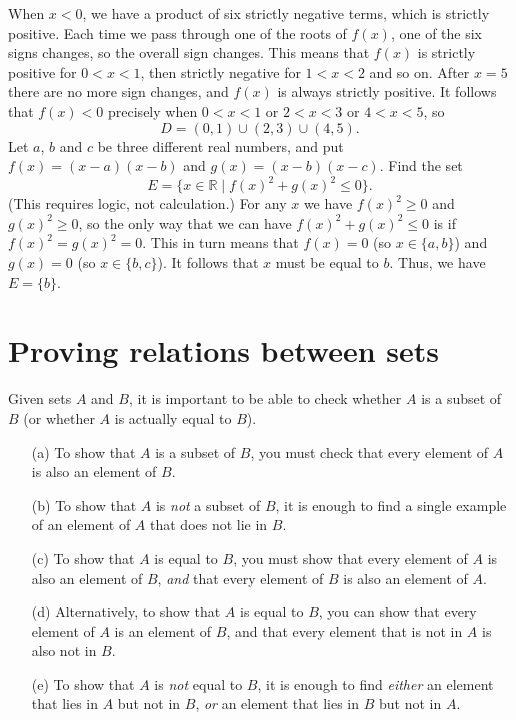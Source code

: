 \documentclass[a4paper]{book}
\newcommand{\RED}[1]{{\color{red}#1}}
\newcommand{\R}         {{\mathbb{R}}}
\newcommand{\st}        {\;|\;}
\renewcommand{\:}{\colon}
\newcommand{\EMPH}[1]{\RED{\emph{#1}}}
\theoremstyle{definition}
\newenvironment{starex}{
 \renewcommand{\thetheorem}{\arabic{chapter}.\arabic{section}.\arabic{theorem}${}^*$}
 \exercise
}{\endexercise}
\renewenvironment{solution}{\SolutionInline}{\endSolutionInline}
\begin{document}
\begin{solution}
 When $x<0$, we have a product of six strictly negative terms, which
 is strictly positive.  Each time we pass through one of the roots of
 $f(x)$, one of the six signs changes, so the overall sign changes.
 This means that $f(x)$ is strictly positive for $0<x<1$, then
 strictly negative for $1<x<2$ and so on.  After $x=5$ there are no
 more sign changes, and $f(x)$ is always strictly positive.  It
 follows that $f(x)<0$ precisely when $0<x<1$ or $2<x<3$ or $4<x<5$,
 so 
 \[ D = (0,1) \cup (2,3) \cup (4,5). \]
\end{solution}
\begin{starex}
 Let $a$, $b$ and $c$ be three different real numbers, and put
 $f(x)=(x-a)(x-b)$ and $g(x)=(x-b)(x-c)$.  Find the set 
 \[ E = \{ x\in\R \st f(x)^2 + g(x)^2 \leq 0\}. \]
 (This requires logic, not calculation.)
\end{starex}
\begin{solution}
 For any $x$ we have $f(x)^2\geq 0$ and $g(x)^2\geq 0$, so the only
 way that we can have $f(x)^2+g(x)^2\leq 0$ is if $f(x)^2=g(x)^2=0$.
 This in turn means that $f(x)=0$ (so $x\in\{a,b\}$) and $g(x)=0$ (so
 $x\in\{b,c\}$).  It follows that $x$ must be equal to $b$.  Thus, we
 have $E=\{b\}$.
\end{solution}

\section{Proving relations between sets}

Given sets $A$ and $B$, it is important to be able to check whether
$A$ is a subset of $B$ (or whether $A$ is actually equal to $B$).
\begin{itemize}
 \item[(a)] To show that $A$ is a subset of $B$, you must check that
  every element of $A$ is also an element of $B$.
 \item[(b)] To show that $A$ is \EMPH{not} a subset of $B$, it is
  enough to find a single example of an element of $A$ that does not
  lie in $B$.
 \item[(c)] To show that $A$ is equal to $B$, you must show that every
  element of $A$ is also an element of $B$, \EMPH{and} that every
  element of $B$ is also an element of $A$.
 \item[(d)] Alternatively, to show that $A$ is equal to $B$, you can
  show that every element of $A$ is an element of $B$, and that every
  element that is not in $A$ is also not in $B$.
 \item[(e)] To show that $A$ is \EMPH{not} equal to $B$, it is enough
  to find \EMPH{either} an element that lies in $A$ but not in $B$,
  \EMPH{or} an element that lies in $B$ but not in $A$.
\end{itemize}
\end{document}

